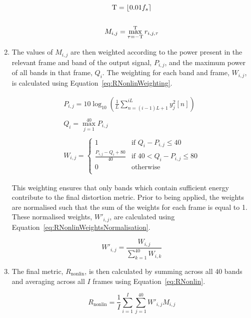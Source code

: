 \begin{enumerate}
					\begin{gather}
						\mathrm{T} = \left\lfloor0.01f_{s}\right\rceil \nonumber \\
						\nonumber \\
						M_{i,j} = \max_{\tau = -\mathrm{T}}^{\mathrm{T}} r_{i,j,\tau}
						\label{eq:RNonlinMaxCrossCorrelation}
					\end{gather}

				\item The values of $M_{i,j}$ are then weighted according to the power present in the
					relevant frame and band of the output signal, $P_{i,j}$, and the maximum power of
					all bands in that frame, $Q_{i}$. The weighting for each band and frame, $W_{i,j}$,
					is calculated using Equation~\ref{eq:RNonlinWeighting}.

					\begin{gather}
						P_{i,j} = 10\log_{10} \left( \frac{1}{L} 
							\sum_{n=(i-1)L+1}^{iL} y_{j}^{2}[n]\right) \nonumber \\
						\nonumber \\
						Q_{i} = \max_{j = 1}^{40} P_{i,j} \nonumber \\
						\nonumber \\
						W_{i,j} = \begin{cases}
							1 & \text{if $Q_{i} - P_{i,j} \leq 40$} \\
							\frac{P_{i,j} - Q_{i} + 80}{40} & 
								\text{if $40 < Q_{i} - P_{i,j} \leq 80$} \\
							0 & \text{otherwise} \\
						\end{cases}
						\label{eq:RNonlinWeighting}
					\end{gather}

					This weighting ensures that only bands which contain sufficient energy contribute
					to the final distortion metric. Prior to being applied, the weights are normalised
					such that the sum of the weights for each frame is equal to 1. These normalised
					weights, $W'_{i,j}$, are calculated using
					Equation~\ref{eq:RNonlinWeightsNormalisation}.

					\begin{equation}
						W'_{i,j} = \frac{W_{i, j}}{\sum_{k = 1}^{40} W_{i,k}}
						\label{eq:RNonlinWeightsNormalisation}
					\end{equation}

				\item The final metric, $R_{\mathrm{nonlin}}$, is then calculated by summing across all 40
					bands and averaging across all $I$ frames using Equation~\ref{eq:RNonlin}.

					\begin{equation}
						R_{\mathrm{nonlin}} = \frac{1}{I} \sum_{i = 1}^{I} \sum_{j = 1}^{40} 
									W'_{i,j}M_{i,j}
						\label{eq:RNonlin}
					\end{equation}

			\end{enumerate}

